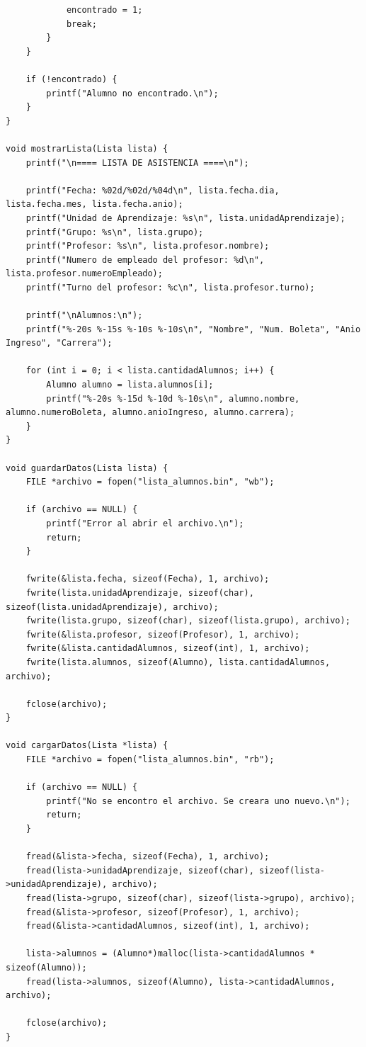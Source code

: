 \documentclass{article}
\begin{document}
\begin{lstlisting}
			encontrado = 1;
			break;
		}
	}
	
	if (!encontrado) {
		printf("Alumno no encontrado.\n");
	}
}

void mostrarLista(Lista lista) {
	printf("\n==== LISTA DE ASISTENCIA ====\n");
	
	printf("Fecha: %02d/%02d/%04d\n", lista.fecha.dia, lista.fecha.mes, lista.fecha.anio);
	printf("Unidad de Aprendizaje: %s\n", lista.unidadAprendizaje);
	printf("Grupo: %s\n", lista.grupo);
	printf("Profesor: %s\n", lista.profesor.nombre);
	printf("Numero de empleado del profesor: %d\n", lista.profesor.numeroEmpleado);
	printf("Turno del profesor: %c\n", lista.profesor.turno);
	
	printf("\nAlumnos:\n");
	printf("%-20s %-15s %-10s %-10s\n", "Nombre", "Num. Boleta", "Anio Ingreso", "Carrera");
	
	for (int i = 0; i < lista.cantidadAlumnos; i++) {
		Alumno alumno = lista.alumnos[i];
		printf("%-20s %-15d %-10d %-10s\n", alumno.nombre, alumno.numeroBoleta, alumno.anioIngreso, alumno.carrera);
	}
}

void guardarDatos(Lista lista) {
	FILE *archivo = fopen("lista_alumnos.bin", "wb");
	
	if (archivo == NULL) {
		printf("Error al abrir el archivo.\n");
		return;
	}
	
	fwrite(&lista.fecha, sizeof(Fecha), 1, archivo);
	fwrite(lista.unidadAprendizaje, sizeof(char), sizeof(lista.unidadAprendizaje), archivo);
	fwrite(lista.grupo, sizeof(char), sizeof(lista.grupo), archivo);
	fwrite(&lista.profesor, sizeof(Profesor), 1, archivo);
	fwrite(&lista.cantidadAlumnos, sizeof(int), 1, archivo);
	fwrite(lista.alumnos, sizeof(Alumno), lista.cantidadAlumnos, archivo);
	
	fclose(archivo);
}

void cargarDatos(Lista *lista) {
	FILE *archivo = fopen("lista_alumnos.bin", "rb");
	
	if (archivo == NULL) {
		printf("No se encontro el archivo. Se creara uno nuevo.\n");
		return;
	}
	
	fread(&lista->fecha, sizeof(Fecha), 1, archivo);
	fread(lista->unidadAprendizaje, sizeof(char), sizeof(lista->unidadAprendizaje), archivo);
	fread(lista->grupo, sizeof(char), sizeof(lista->grupo), archivo);
	fread(&lista->profesor, sizeof(Profesor), 1, archivo);
	fread(&lista->cantidadAlumnos, sizeof(int), 1, archivo);
	
	lista->alumnos = (Alumno*)malloc(lista->cantidadAlumnos * sizeof(Alumno));
	fread(lista->alumnos, sizeof(Alumno), lista->cantidadAlumnos, archivo);
	
	fclose(archivo);
}
	\end{lstlisting}
	
\end{document}
